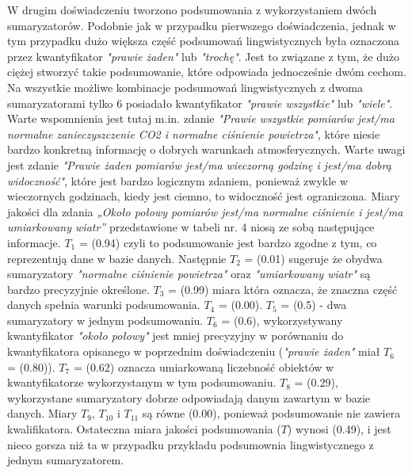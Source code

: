 \documentclass{article}
\begin{document}
W drugim doświadczeniu tworzono podsumowania z wykorzystaniem dwóch sumaryzatorów. Podobnie jak w przypadku pierwszego doświadczenia, jednak w tym przypadku dużo większa część podsumowań lingwistycznych była oznaczona przez kwantyfikator \textit{"prawie żaden"} lub \textit{"trochę"}. Jest to związane z tym, że dużo ciężej stworzyć takie podsumowanie, które odpowiada jednocześnie dwóm cechom. Na wszystkie możliwe kombinacje podsumowań lingwistycznych z dwoma sumaryzatorami tylko 6 posiadało kwantyfikator \textit{"prawie wszystkie"} lub \textit{"wiele"}. Warte wspomnienia jest tutaj m.in. zdanie \textit{"Prawie wszystkie pomiarów jest/ma normalne zanieczyszczenie CO2 i normalne ciśnienie powietrza"}, które niesie bardzo konkretną informację o dobrych warunkach atmosferycznych. Warte uwagi jest zdanie \textit{"Prawie żaden pomiarów jest/ma wieczorną godzinę i jest/ma dobrą widoczność"}, które jest bardzo logicznym zdaniem, ponieważ zwykle w wieczornych godzinach, kiedy jest ciemno, to widoczność jest ograniczona. Miary jakości dla zdania \textit{„Około połowy pomiarów jest/ma normalne ciśnienie i jest/ma umiarkowany wiatr”} przedstawione w tabeli nr. 4 niosą ze sobą następujące informacje. \(T_1\) = (0.94) czyli to podsumowanie jest bardzo zgodne z tym, co reprezentują dane w bazie danych. Następnie \(T_2\) = (0.01) sugeruje że obydwa sumaryzatory \textit{"normalne ciśnienie powietrza"} oraz \textit{"umiarkowany wiatr"} są bardzo precyzyjnie określone. \(T_3\) = (0.99) miara która oznacza, że znaczna część danych spełnia warunki podsumowania. \(T_4\) =  (0.00). \(T_5\) = (0.5) - dwa sumaryzatory w jednym podsumowaniu. \(T_6\) = (0.6), wykorzystywany kwantyfikator \textit{"około połowy"} jest mniej precyzyjny w porównaniu do kwantyfikatora opisanego w poprzednim doświadczeniu (\textit{"prawie żaden"} miał \(T_6\) = (0.80)). \(T_7\) = (0.62) oznacza umiarkowaną liczebność obiektów w kwantyfikatorze wykorzystanym w tym podsumowaniu. \(T_8\) = (0.29), wykorzystane sumaryzatory dobrze odpowiadają danym zawartym w bazie danych. Miary \(T_9\), \(T_{10}\) i \(T_{11}\) są równe (0.00), ponieważ podsumowanie nie zawiera kwalifikatora. Ostateczna miara jakości podsumowania (\(T\)) wynosi (0{.}49), i jest nieco gorsza niż ta w przypadku przykładu podsumownia lingwistycznego z jednym sumaryzatorem. \\
\end{document}

